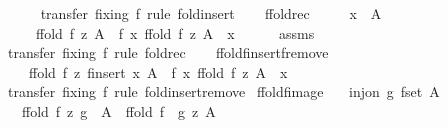 \begin{isabellebody}
%
\isadelimproof
\ \ \ \ %
\endisadelimproof
%
\isatagproof
{}\isamarkupfalse%
\ {\isacharparenleft}transfer\ fixing{\isacharcolon}\ f{\isacharparenright}\ {\isacharparenleft}rule\ fold{\isacharunderscore}insert{}{\isacharparenright}%
\endisatagproof
{\isafoldproof}%
%
\isadelimproof
\isanewline
%
\endisadelimproof
\isanewline
\ \ \isamarkupfalse%
\ ffold{\isacharunderscore}rec{\isacharcolon}\isanewline
\ \ \ \ \ {\isachardoublequoteopen}x\ {\isacharbar}{\isasymin}{\isacharbar}\ A{\isachardoublequoteclose}\isanewline
\ \ \ \ \ {\isachardoublequoteopen}ffold\ f\ z\ A\ {\isacharequal}\ f\ x\ {\isacharparenleft}ffold\ f\ z\ {\isacharparenleft}A\ {\isacharbar}{\isacharminus}{\isacharbar}\ {\isacharbraceleft}{\isacharbar}x{\isacharbar}{\isacharbraceright}{\isacharparenright}{\isacharparenright}{\isachardoublequoteclose}\isanewline
%
\isadelimproof
\ \ \ \ %
\endisadelimproof
%
\isatagproof
{}\isamarkupfalse%
\ assms\ \isamarkupfalse%
\ {\isacharparenleft}transfer\ fixing{\isacharcolon}\ f{\isacharparenright}\ {\isacharparenleft}rule\ fold{\isacharunderscore}rec{\isacharparenright}%
\endisatagproof
{\isafoldproof}%
%
\isadelimproof
\isanewline
%
\endisadelimproof
\isanewline
\ \ \isamarkupfalse%
\ ffold{\isacharunderscore}finsert{\isacharunderscore}fremove{\isacharcolon}\isanewline
\ \ \ \ {\isachardoublequoteopen}ffold\ f\ z\ {\isacharparenleft}finsert\ x\ A{\isacharparenright}\ {\isacharequal}\ f\ x\ {\isacharparenleft}ffold\ f\ z\ {\isacharparenleft}A\ {\isacharbar}{\isacharminus}{\isacharbar}\ {\isacharbraceleft}{\isacharbar}x{\isacharbar}{\isacharbraceright}{\isacharparenright}{\isacharparenright}{\isachardoublequoteclose}\isanewline
%
\isadelimproof
\ \ \ \ \ %
\endisadelimproof
%
\isatagproof
{}\isamarkupfalse%
\ {\isacharparenleft}transfer\ fixing{\isacharcolon}\ f{\isacharparenright}\ {\isacharparenleft}rule\ fold{\isacharunderscore}insert{\isacharunderscore}remove{\isacharparenright}%
\endisatagproof
{\isafoldproof}%
%
\isadelimproof
\isanewline
%
\endisadelimproof
{}\isamarkupfalse%
\isanewline
\isanewline
{}\isamarkupfalse%
\ ffold{\isacharunderscore}fimage{\isacharcolon}\isanewline
\ \ \ {\isachardoublequoteopen}inj{\isacharunderscore}on\ g\ {\isacharparenleft}fset\ A{\isacharparenright}{\isachardoublequoteclose}\isanewline
\ \ \ {\isachardoublequoteopen}ffold\ f\ z\ {\isacharparenleft}g\ {\isacharbar}{\isacharbackquote}{\isacharbar}\ A{\isacharparenright}\ {\isacharequal}\ ffold\ {\isacharparenleft}f\ {\isasymcirc}\ g{\isacharparenright}\ z\ A{\isachardoublequoteclose}\isanewline

\end{isabellebody}
